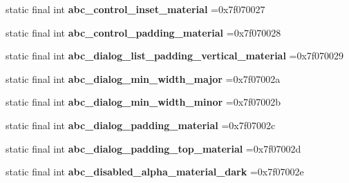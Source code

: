 \begin{DoxyCompactItemize}
\item 
\hypertarget{classcheck_1_1test_1_1_r_1_1dimen_adee1c9140626eabe295e67cbc69e0cfd}{}static final int {\bfseries abc\+\_\+control\+\_\+inset\+\_\+material} =0x7f070027\label{classcheck_1_1test_1_1_r_1_1dimen_adee1c9140626eabe295e67cbc69e0cfd}

\item 
\hypertarget{classcheck_1_1test_1_1_r_1_1dimen_a9a365ae92c8276f7ef3cf54a11b541d4}{}static final int {\bfseries abc\+\_\+control\+\_\+padding\+\_\+material} =0x7f070028\label{classcheck_1_1test_1_1_r_1_1dimen_a9a365ae92c8276f7ef3cf54a11b541d4}

\item 
\hypertarget{classcheck_1_1test_1_1_r_1_1dimen_a948d5f3d3f03744a2db1d074335f6e66}{}static final int {\bfseries abc\+\_\+dialog\+\_\+list\+\_\+padding\+\_\+vertical\+\_\+material} =0x7f070029\label{classcheck_1_1test_1_1_r_1_1dimen_a948d5f3d3f03744a2db1d074335f6e66}

\item 
\hypertarget{classcheck_1_1test_1_1_r_1_1dimen_aa618b640978ed44767c1097ee8eeb455}{}static final int {\bfseries abc\+\_\+dialog\+\_\+min\+\_\+width\+\_\+major} =0x7f07002a\label{classcheck_1_1test_1_1_r_1_1dimen_aa618b640978ed44767c1097ee8eeb455}

\item 
\hypertarget{classcheck_1_1test_1_1_r_1_1dimen_a311dcc6cb77411eafbaff03f8c164cef}{}static final int {\bfseries abc\+\_\+dialog\+\_\+min\+\_\+width\+\_\+minor} =0x7f07002b\label{classcheck_1_1test_1_1_r_1_1dimen_a311dcc6cb77411eafbaff03f8c164cef}

\item 
\hypertarget{classcheck_1_1test_1_1_r_1_1dimen_ae37fe12a196bec3d450f2e3bc944572c}{}static final int {\bfseries abc\+\_\+dialog\+\_\+padding\+\_\+material} =0x7f07002c\label{classcheck_1_1test_1_1_r_1_1dimen_ae37fe12a196bec3d450f2e3bc944572c}

\item 
\hypertarget{classcheck_1_1test_1_1_r_1_1dimen_af4a39022bd8de4af01a789abb33aaa73}{}static final int {\bfseries abc\+\_\+dialog\+\_\+padding\+\_\+top\+\_\+material} =0x7f07002d\label{classcheck_1_1test_1_1_r_1_1dimen_af4a39022bd8de4af01a789abb33aaa73}

\item 
\hypertarget{classcheck_1_1test_1_1_r_1_1dimen_a3f427e5686fb15e57e3d5909b5f06ec4}{}static final int {\bfseries abc\+\_\+disabled\+\_\+alpha\+\_\+material\+\_\+dark} =0x7f07002e\label{classcheck_1_1test_1_1_r_1_1dimen_a3f427e5686fb15e57e3d5909b5f06ec4}


\end{DoxyCompactItemize}
